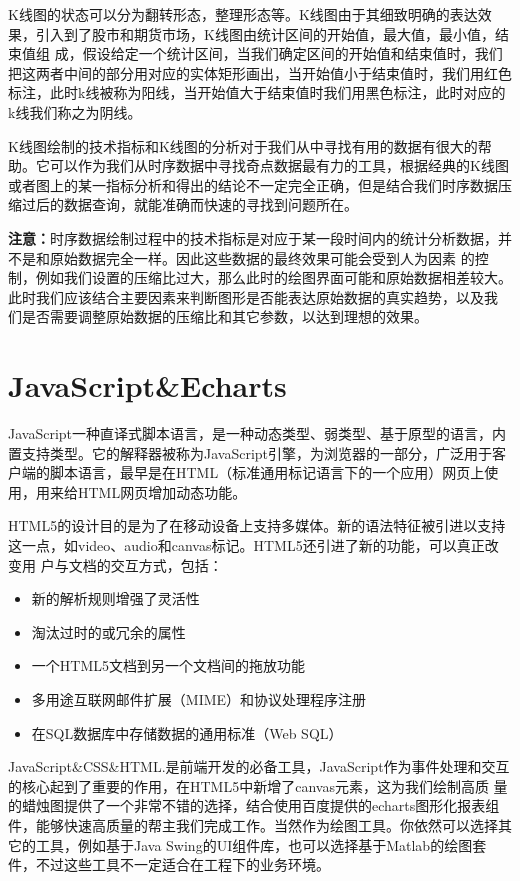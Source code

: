 K线图的状态可以分为翻转形态，整理形态等。K线图由于其细致明确的表达效果，引入到了股市和期货市场，K线图由统计区间的开始值，最大值，最小值，结束值组
成，假设给定一个统计区间，当我们确定区间的开始值和结束值时，我们把这两者中间的部分用对应的实体矩形画出，当开始值小于结束值时，我们用红色标注，此时k线被称为阳线，当开始值大于结束值时我们用黑色标注，此时对应的k线我们称之为阴线。

K线图绘制的技术指标和K线图的分析对于我们从中寻找有用的数据有很大的帮助。它可以作为我们从时序数据中寻找奇点数据最有力的工具，根据经典的K线图或者图上的某一指标分析和得出的结论不一定完全正确，但是结合我们时序数据压缩过后的数据查询，就能准确而快速的寻找到问题所在。

\textbf{注意：}时序数据绘制过程中的技术指标是对应于某一段时间内的统计分析数据，并不是和原始数据完全一样。因此这些数据的最终效果可能会受到人为因素
的控制，例如我们设置的压缩比过大，那么此时的绘图界面可能和原始数据相差较大。此时我们应该结合主要因素来判断图形是否能表达原始数据的真实趋势，以及我
们是否需要调整原始数据的压缩比和其它参数，以达到理想的效果。

\section{JavaScript\&Echarts}
\label{section 2.4}
JavaScript一种直译式脚本语言，是一种动态类型、弱类型、基于原型的语言，内置支持类型。它的解释器被称为JavaScript引擎，为浏览器的一部分，广泛用于客户端的脚本语言，最早是在HTML（标准通用标记语言下的一个应用）网页上使用，用来给HTML网页增加动态功能。

HTML5的设计目的是为了在移动设备上支持多媒体。新的语法特征被引进以支持这一点，如video、audio和canvas标记。HTML5还引进了新的功能，可以真正改变用
户与文档的交互方式，包括：\newline
\begin{itemize}
 \setlength{\itemsep}{1pt}
 \setlength{\parskip}{0pt}
 \setlength{\parsep}{0pt}
 \item 新的解析规则增强了灵活性
 \item 淘汰过时的或冗余的属性
 \item 一个HTML5文档到另一个文档间的拖放功能
 \item 多用途互联网邮件扩展（MIME）和协议处理程序注册
 \item 在SQL数据库中存储数据的通用标准（Web SQL） 
\end{itemize}

JavaScript\&CSS\&HTML.是前端开发的必备工具，JavaScript作为事件处理和交互的核心起到了重要的作用，在HTML5中新增了canvas元素，这为我们绘制高质
量的蜡烛图提供了一个非常不错的选择，结合使用百度提供的echarts图形化报表组件，能够快速高质量的帮主我们完成工作。当然作为绘图工具。你依然可以选择其
它的工具，例如基于Java Swing的UI组件库，也可以选择基于Matlab的绘图套件，不过这些工具不一定适合在工程下的业务环境。



